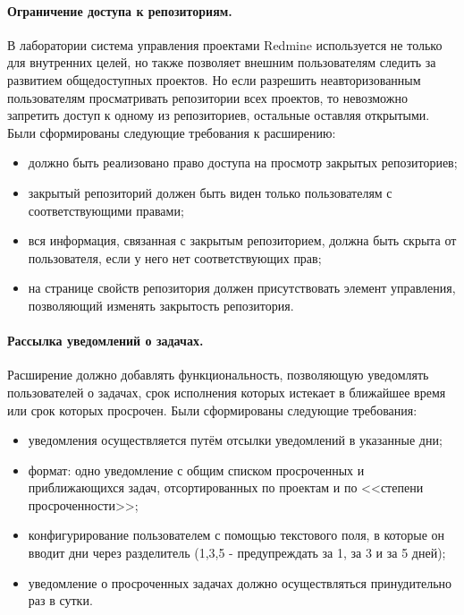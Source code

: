 \paragraph{Ограничение доступа к репозиториям.}
\label{definiton:private_repository}
В лаборатории система управления проектами Redmine используется не только для
внутренних целей, но также позволяет внешним пользователям следить за развитием
общедоступных проектов. Но если разрешить неавторизованным пользователям
просматривать репозитории всех проектов, то невозможно запретить доступ к
одному из репозиториев, остальные оставляя открытыми. Были сформированы
следующие требования к расширению:
\begin{itemize}
  \item должно быть реализовано право доступа на просмотр закрытых
  репозиториев;
  \item закрытый репозиторий должен быть виден только пользователям с
  соответствующими правами;  
  \item вся информация, связанная с закрытым репозиторием, должна быть скрыта
  от пользователя, если у него нет соответствующих прав;
  \item на странице свойств репозитория должен присутствовать элемент
  управления, позволяющий изменять закрытость репозитория.
\end{itemize}

\paragraph{Рассылка уведомлений о задачах.}
\label{definition:due_date_reminder}
Расширение должно добавлять функциональность, позволяющую уведомлять
пользователей о задачах, срок исполнения которых истекает в ближайшее время или
срок которых просрочен. Были сформированы следующие требования:
\begin{itemize}
  \item уведомления осуществляется путём отсылки уведомлений в указанные дни;
  \item формат: одно уведомление с общим списком просроченных и приближающихся
  задач, отсортированных по проектам и по <<степени просроченности>>; 
  \item конфигурирование пользователем с помощью текстового поля, в которые он
  вводит дни через разделитель (1,3,5 - предупреждать за 1, за 3 и за 5
  дней);
  \item уведомление о просроченных задачах должно осуществляться принудительно
  раз в сутки.
\end{itemize}

